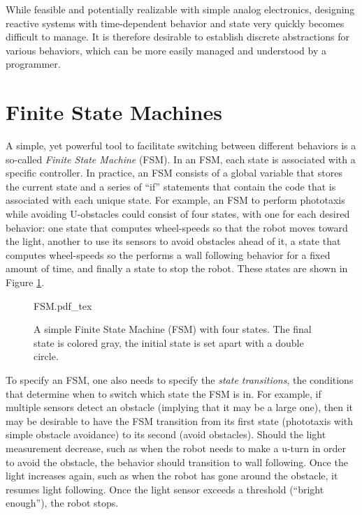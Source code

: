 While feasible and potentially realizable with simple analog electronics, designing reactive systems with time-dependent behavior and state very quickly becomes difficult to manage. It is therefore desirable to establish discrete abstractions for various behaviors, which can be more easily managed and understood by a programmer.
%
%
\section{Finite State Machines}\label{sec:fsm}
A simple, yet powerful tool to facilitate switching between different behaviors is a so-called \emph{Finite State Machine} (FSM). In an FSM, each state is associated with a specific controller. In practice, an FSM consists of a global variable that stores the current state and a series of ``if'' statements that contain the code that is associated with each unique state. For example, an FSM to perform phototaxis while avoiding U-obstacles could consist of four states, with one for each desired behavior: one state that computes wheel-speeds so that the robot moves toward the light, another to use its sensors to avoid obstacles ahead of it, a state that computes wheel-speeds so the performs a wall following behavior for a fixed amount of time, and finally a state to stop the robot. These states are shown in Figure \ref{fig:fsm}.

\begin{figure}
\centering
    \small
    \def\svgwidth{0.9\textwidth}
    {FSM.pdf_tex}
\caption{A simple Finite State Machine (FSM) with four states. The final state is colored gray, the initial state is set apart with a double circle.\label{fig:fsm}}
\end{figure}


To specify an FSM, one also needs to specify the \emph{state transitions}, the conditions that determine when to switch which state the FSM is in. For example, if multiple sensors detect an obstacle (implying that it may be a large one), then it may be desirable to have the FSM transition from its first state (phototaxis with simple obstacle avoidance) to its second (avoid obstacles). Should the light measurement decrease, such as when the robot needs to make a u-turn in order to avoid the obstacle, the behavior should transition to wall following. Once the light increases again, such as when the robot has gone around the obstacle, it resumes light following. Once the light sensor exceeds a threshold (``bright enough''), the robot stops. 

